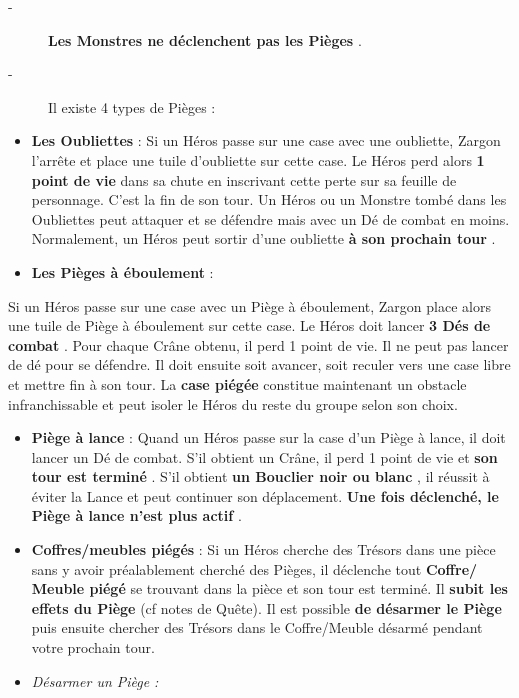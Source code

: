 \documentclass{scrartcl}%
\begin{document}
\begin{description}%
\item[{-} ]%
%
\textcolor{mygreen}{%
\textbf{Les Monstres ne déclenchent pas les Pièges}%
}%
.
%
\item[{-} ]%
%
 Il existe 4 types de Pièges :
%
\end{description}%
\begin{itemize}%
\item%
%
\textcolor{mygreen}{%
\textbf{Les Oubliettes}%
}%
\textit{ }%
 : Si un Héros passe sur une case avec une oubliette, Zargon l'arrête et place une tuile d'oubliette sur cette case. Le Héros perd alors %
\textcolor{mygreen}{%
\textbf{1 point de vie}%
}%
\textit{ }%
 dans sa chute en inscrivant cette perte sur sa feuille de personnage. C'est la fin de son tour. Un Héros ou un Monstre tombé dans les Oubliettes peut attaquer et se défendre mais avec un Dé de combat en moins. Normalement, un Héros peut sortir d'une oubliette%
\textcolor{mygreen}{%
\textbf{ à son prochain tour}%
}%
.
%
\item%
%
\textcolor{mygreen}{%
\textbf{Les Pièges à éboulement}%
}%
\textit{ }%
 :
%
\end{itemize}%
Si un Héros passe sur une case avec un Piège à éboulement, Zargon place alors une tuile de Piège à éboulement sur cette case. Le Héros doit lancer %
\textcolor{mygreen}{%
\textbf{3 Dés de combat}%
}%
. Pour chaque Crâne obtenu, il perd 1 point de vie. Il ne peut pas lancer de dé pour se défendre. Il doit ensuite soit avancer, soit reculer vers une case libre et mettre fin à son tour. La %
\textcolor{mygreen}{%
\textbf{case piégée}%
}%
\textit{ }%
 constitue maintenant un obstacle infranchissable et peut isoler le Héros du reste du groupe selon son choix.
%
\begin{itemize}%
\item%
%
\textcolor{mygreen}{%
\textbf{Piège à lance}%
}%
: Quand un Héros passe sur la case d'un Piège à lance, il doit lancer un Dé de combat. S'il obtient un Crâne, il perd 1 point de vie et %
\textcolor{mygreen}{%
\textbf{son tour est terminé}%
}%
. S'il obtient %
\textcolor{mygreen}{%
\textbf{un Bouclier noir ou blanc}%
}%
, il réussit à éviter la Lance et peut continuer son déplacement.%
\textcolor{mygreen}{%
\textbf{ Une fois déclenché, le Piège à lance n'est plus actif}%
}%
.
%
\item%
%
\textcolor{mygreen}{%
\textbf{Coffres/meubles piégés}%
}%
: Si un Héros cherche des Trésors dans une pièce sans y avoir préalablement cherché des Pièges, il déclenche tout %
\textcolor{mygreen}{%
\textbf{Coffre/ Meuble piégé}%
}%
\textit{ }%
 se trouvant dans la pièce et son tour est terminé. Il %
\textcolor{mygreen}{%
\textbf{subit les effets du Piège }%
}%
(cf notes de Quête). Il est possible %
\textcolor{mygreen}{%
\textbf{de désarmer le Piège}%
}%
\textit{ }%
 puis ensuite chercher des Trésors dans le Coffre/Meuble désarmé pendant votre prochain tour.
%
\item%
%
\textit{Désarmer un Piège}%
\textit{ :
}%
\end{itemize}%
\end{document}
